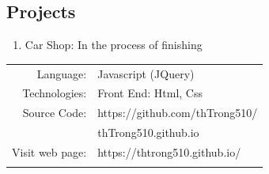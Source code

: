 \documentclass[11pt,oneside,a4paper,titlepage]{article}
\begin{document}
\begin{tcolorbox}
\begin{minipage}[t]{11cm}
\begin{tcolorbox}[grow to right by=0.75cm,colframe=white,colback=white]
        \section*{Projects}
        \begin{enumerate}
            \item {Car Shop: In the process of finishing}
        \end{enumerate}
        \begin{center}
        \begin{tabular}{r l}
        Language:& Javascript (JQuery) \\
        Technologies:& Front End:  Html, Css \\ 
        Source Code:& https://github.com/thTrong510/ \\
                    & thTrong510.github.io \\
        Visit web page:& https://thtrong510.github.io/ \\ \\ 
        \end{tabular}
        \end{center}
        \end{tcolorbox}
    \end{minipage}
\end{tcolorbox}
\end{document}
